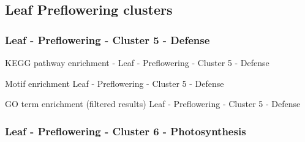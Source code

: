 \subsection{Leaf Preflowering clusters}

\subsubsection[Cluster 5  - Defense]{Leaf - Preflowering - Cluster 5  - Defense}

\vspace{1em}



\vspace{1em}

\begin{table}[!ht]
\begin{center}


\end{center}
\caption{KEGG pathway enrichment - Leaf - Preflowering - Cluster 5  - Defense}

\end{table}
\vspace{1em}

\begin{table}[!ht]
\begin{center}


\end{center}
\caption{Motif enrichment Leaf - Preflowering - Cluster 5  - Defense}

\end{table}
\vspace{1em}

\begin{table}[!ht]
\begin{center}


\end{center}
\caption{GO term enrichment (filtered results) Leaf - Preflowering - Cluster 5  - Defense}

\end{table}
\clearpage

\subsubsection[Cluster 6  - Photosynthesis]{Leaf - Preflowering - Cluster 6  - Photosynthesis}

